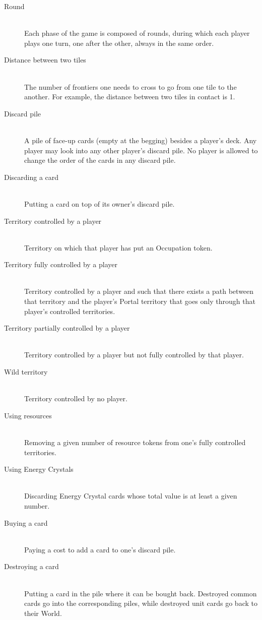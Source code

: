 \documentclass[a4paper]{article}
\begin{document}
    \begin{description}
        \item[Round] \hfill \\
            Each phase of the game is composed of rounds,
            during which each player plays one turn, one after the other,
            always in the same order.
        \item[Distance between two tiles] \hfill \\
            The number of frontiers one needs to cross to go from one tile to the another.
            For example, the distance between two tiles in contact is 1.
        \item[Discard pile] \hfill \\
            A pile of face-up cards (empty at the begging) besides a player's deck.
            Any player may look into any other player's discard pile.
            No player is allowed to change the order of the cards in any discard pile.
        \item[Discarding a card] \hfill \\
            Putting a card on top of its owner's discard pile.
        \item[Territory controlled by a player] \hfill \\
            Territory on which that player has put an Occupation token.
        \item[Territory fully controlled by a player] \hfill \\
            Territory controlled by a player and such that there exists a path
            between that territory and the player's Portal territory that
            goes only through that player's controlled territories.
        \item[Territory partially controlled by a player] \hfill \\
            Territory controlled by a player but not fully controlled by that player.
        \item[Wild territory] \hfill \\
            Territory controlled by no player.
        \item[Using resources] \hfill \\
            Removing a given number of resource tokens from one's fully controlled
            territories.
        \item[Using Energy Crystals] \hfill \\
            Discarding Energy Crystal cards whose total value is at least a given number.
        \item[Buying a card] \hfill \\
            Paying a cost to add a card to one's discard pile.
        \item[Destroying a card] \hfill \\
            Putting a card in the pile where it can be bought back.
            Destroyed common cards go into the corresponding piles,
            while destroyed unit cards go back to their World.
    \end{description}
\end{document}
